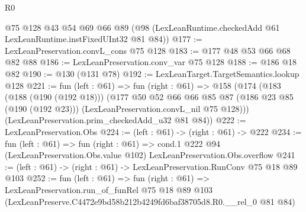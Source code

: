 \begin{lexlean}{R0}
\begin{coremodule}
    @75
    @128
    @43
    @54
    @69
    @66
    @89
    (@98 (LexLeanRuntime.checkedAdd @61 LexLeanRuntime.instFixedUInt32 @81 @84))
@177 := LexLeanPreservation.convL_cons @75 @128
@183 := @177 @48 @53 @66 @68 @82 @88
@186 := LexLeanPreservation.conv_var @75 @128
@188 := @186 @18 @82
@190 := @130 (@131 @78)
@192 := LexLeanTarget.TargetSemantics.lookup @128
@221 := fun (left : @61) =>
  fun (right : @61) =>
  @158
    (@174
      (@183
        (@188 (@190 (@192 @18)))
        (@177
          @50
          @52
          @66
          @66
          @85
          @87
          (@186 @23 @85 (@190 (@192 @23)))
          (LexLeanPreservation.convL_nil @75 @128)))
      (LexLeanPreservation.prim_checkedAdd_u32 @81 @84))
@222 := LexLeanPreservation.Obs
@224 := (left : @61) -> (right : @61) -> @222
@234 := fun (left : @61) =>
  fun (right : @61) =>
  cond.{1} @222 @94 (LexLeanPreservation.Obs.value @102) LexLeanPreservation.Obs.overflow
@241 := (left : @61) -> (right : @61) -> LexLeanPreservation.RunConv @75 @18 @89 @103
@252 := fun (left : @61) =>
  fun (right : @61) =>
  LexLeanPreservation.run_of_funRel
    @75
    @18
    @89
    @103
    (LexLeanPreserve.C4472e9bd58b212b4249fd6baf38705d8.R0.__rel_0 @81 @84)
\end{coremodule}
\end{lexlean}
